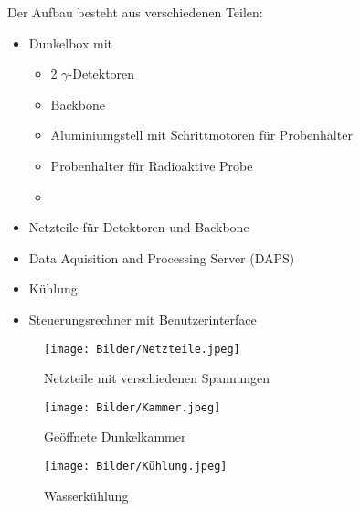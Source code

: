 \documentclass[12pt,twoside,a4paper]{scrartcl}
\begin{document}
	Der Aufbau besteht aus verschiedenen Teilen:
	\begin{itemize}
		\item Dunkelbox mit 
		\begin{itemize}
			\item 2 $\gamma$-Detektoren
			\item Backbone
			\item Aluminiumgstell mit Schrittmotoren für Probenhalter
			\item Probenhalter für Radioaktive Probe
			\item 
		\end{itemize}
		\item Netzteile für Detektoren und Backbone
		\item Data Aquisition and Processing Server (DAPS)
		\item Kühlung
		\item Steuerungsrechner mit Benutzerinterface
	\end{itemize}

	\begin{figure*}[H]
	
		
		\begin{minipage}{0.25\textwidth}

					\texttt{[image: Bilder/Netzteile.jpeg]}
					\label{Aufbau::Netzteile}
					\caption{Netzteile mit verschiedenen Spannungen}

		\end{minipage}
		\begin{minipage}{0.25\textwidth}

					\texttt{[image: Bilder/Kammer.jpeg]}
					\label{Aufbau::Kammer}
					\caption{Geöffnete Dunkelkammer}

		\end{minipage}
		\begin{minipage}{0.25\textwidth}
		
					\texttt{[image: Bilder/Kühlung.jpeg]}
					\label{Aufbau::Kühlung}
					\caption{Wasserkühlung}
		\end{minipage}

	\end{figure*}
\end{document}
